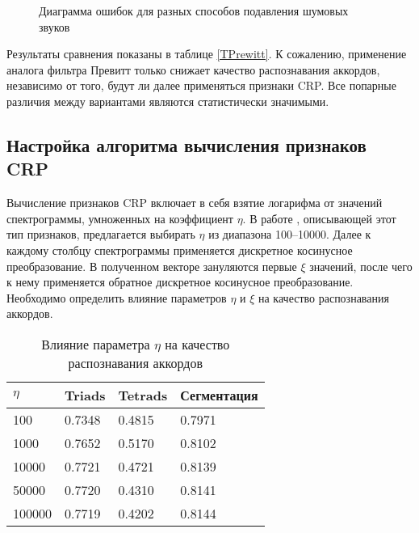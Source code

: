 \begin{figure}[h]
  \begin{minipage}[h]{0.49\linewidth}
  \end{minipage}
  \hfill
  \begin{minipage}[h]{0.49\linewidth}
  \end{minipage}
  \caption{Диаграмма ошибок для разных способов подавления шумовых звуков}
  \label{img:prewitt}
\end{figure}

Результаты сравнения показаны в таблице \ref{TPrewitt}. К сожалению, применение
аналога фильтра Превитт только снижает качество распознавания аккордов,
независимо от того, будут ли далее применяться признаки CRP. Все попарные
различия между вариантами являются статистически значимыми.

\subsection{Настройка алгоритма вычисления признаков CRP} \label{ssect3_crp}

Вычисление признаков CRP включает в себя взятие логарифма от значений
спектрограммы, умноженных на коэффициент $\eta$. В работе \cite{Mueller2009},
описывающей этот тип признаков, предлагается выбирать $\eta$ из диапазона
100--10000. Далее к каждому столбцу спектрограммы применяется дискретное
косинусное преобразование. В полученном векторе зануляются первые $\xi$
значений, после чего к нему применяется обратное дискретное косинусное
преобразование. Необходимо определить влияние параметров $\eta$ и $\xi$ на
качество распознавания аккордов.

\begin{table} [htbp]
  \centering
  \parbox{15cm}{\caption{Влияние параметра $\eta$ на качество распознавания
  аккордов} \label{Teta}}
  \begin{tabular}{|l|l|l|l|}
  \hline
  $\eta$ & Triads & Tetrads & Сегментация \\
  \hline
  100 & 0.7348 & 0.4815 & 0.7971 \\
  1000 & 0.7652 & 0.5170 & 0.8102 \\
  10000 & 0.7721 & 0.4721 & 0.8139 \\
  50000 & 0.7720 & 0.4310 & 0.8141 \\
  100000 & 0.7719 & 0.4202 & 0.8144 \\
  \hline
  \end{tabular}
\end{table}

